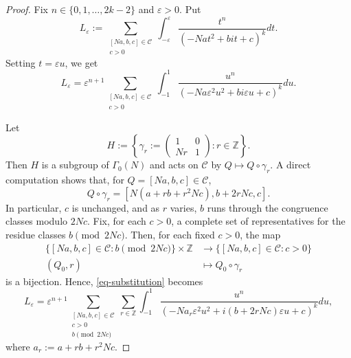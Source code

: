 \documentclass[12pt]{amsart}
\numberwithin{equation}{section}
\theoremstyle{definition}
\begin{document}
\begin{proof}
Fix $n\in\{0,1,\ldots,2k-2\}$ and $\varepsilon>0$. Put
$$L_{\varepsilon}:=\sum\limits_{\substack{[Na,b,c]\in\mathcal{C} \\ c>0}}\int_{-\varepsilon}^{\varepsilon}\frac{t^{n}}{(-Nat^{2}+bit+c)^{k}}dt.$$
Setting $t=\varepsilon u$, we get
\begin{equation}\label{eq-substitution}
    L_{\varepsilon}=\varepsilon^{n+1}\sum\limits_{\substack{[Na,b,c]\in\mathcal{C} \\ c>0}}\int_{-1}^{1}\frac{u^{n}}{(-Na\varepsilon^{2}u^{2}+bi\varepsilon u+c)^{k}}du.
\end{equation}

Let
$$H:=\left\{\gamma_{r}:=\left(\begin{smallmatrix}
    1 & 0 \\ Nr & 1
\end{smallmatrix}\right):r\in\mathbb{Z}\right\}.$$
Then $H$ is a subgroup of $\Gamma_{0}(N)$ and acts on $\mathcal{C}$ by $Q\mapsto Q\circ\gamma_{r}$.
A direct computation shows that, for $Q=[Na,b,c]\in\mathcal{C}$,
\begin{equation*}
Q\circ\gamma_{r}=[N(a+rb+r^2Nc),b+2rNc,c].
\end{equation*}
In particular, $c$ is unchanged, and as $r$ varies, $b$ runs through the congruence classes modulo $2Nc$.
Fix, for each $c>0$, a complete set of representatives for the residue classes $b\pmod{2Nc}$.
Then, for each fixed $c>0$, the map
\begin{align*}
    \{[Na,b,c]\in\mathcal{C}:b\pmod{2Nc}\}\times\mathbb{Z}&\rightarrow\{[Na,b,c]\in\mathcal{C}:c>0\}\\
    (Q_{0},r)&\mapsto Q_{0}\circ\gamma_{r}
\end{align*}
is a bijection. 
Hence, \eqref{eq-substitution} becomes
\begin{equation}\label{eq-doublesum}
L_{\varepsilon}=\varepsilon^{n+1}\sum_{\substack{[Na,b,c]\in\mathcal{C} \\ c>0 \\ b\pmod{2Nc}}}\sum_{r\in\mathbb{Z}}\int_{-1}^{1}
\frac{u^{n}}{(-Na_{r}\varepsilon^{2}u^{2}+i(b+2rNc)\varepsilon u+c)^k}du,
\end{equation}
where $a_{r}:=a+rb+r^{2}Nc$.


\end{proof}
\end{document}
